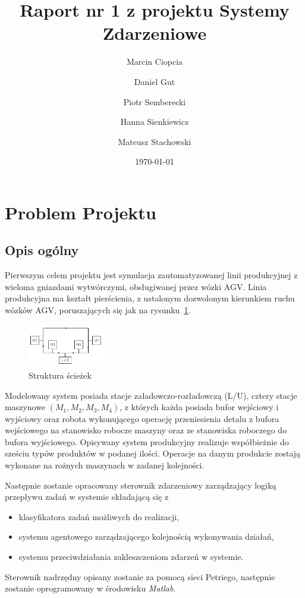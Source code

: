 \documentclass[10pt, a4paper]{article}
\author{Marcin Ciopcia \and Daniel Gut \and Piotr Semberecki \and Hanna Sienkiewicz \and Mateusz Stachowski
}
\title{Raport nr 1 z projektu Systemy Zdarzeniowe}
\date{\today}
\begin{document}
\maketitle



\section{Problem Projektu}
\label{sec:wstep}
%
\subsection{Opis ogólny}
Pierwszym celem projektu jest symulacja zautomatyzowanej linii produkcyjnej z wieloma gniazdami wytwórczymi, obsługiwanej przez wózki AGV. Linia produkcyjna ma kształt pierścienia, z ustalonym dozwolonym kierunkiem ruchu wózków AGV, poruszających się jak na rysunku~\ref{fig:sch}.
 \begin{figure}[H]
  \begin{center}
    \includegraphics[width=0.3\textwidth]{./obrazki/Schemat.png}
    \caption{Struktura ścieżek}
    \label{fig:sch}
  \end{center}
 \end{figure}
Modelowany system posiada stacje załadowczo-rozładowczą (L/U), cztery stacje  maszynowe $(M_1,M_2,M_3,M_4)$, z których każda posiada bufor wejściowy i wyjściowy oraz robota wykonującego operację przeniesienia detalu z bufora wejściowego na stanowisko robocze maszyny oraz ze stanowiska roboczego do bufora wyjściowego. Opisywany system produkcyjny realizuje współbieżnie do sześciu typów produktów w podanej ilości. Operacje na danym produkcie zostają wykonane na rożnych maszynach w zadanej kolejności.
 
 
Następnie zostanie opracowany sterownik zdarzeniowy zarządzający logiką przepływu zadań w systemie składającą się z
\begin{itemize}
\item klasyfikatora zadań możliwych do realizacji,
\item systemu agentowego zarządzającego kolejnością wykonywania działań,
\item systemu przeciwdziałania zakleszczeniom zdarzeń w systemie.
\end{itemize}
Sterownik nadrzędny opisany zostanie za pomocą sieci Petriego, następnie zostanie oprogramowany w środowisku \textit{Matlab}.
\end{document}
